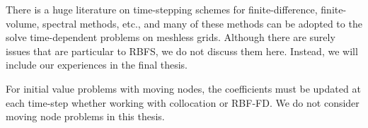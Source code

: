 \documentclass{report}
\begin{document}
{There is a huge literature on time-stepping schemes for finite-difference, finite-volume, spectral methods, etc., and many of these methods can be adopted to the solve time-dependent problems on meshless grids. Although there are surely issues that are particular to RBFS, we do not discuss them here. Instead, we will include our experiences in the final thesis. 


For initial value problems with moving nodes, the coefficients must be updated at each time-step whether working with collocation or RBF-FD. We do not consider moving node problems in this thesis. 
%



%

}
\end{document}
